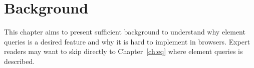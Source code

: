 \documentclass[a4paper,11pt]{kth-mag}
\begin{document}


  \chapter{Background}\label{ch:background}
    This chapter aims to present sufficient background to understand why element queries is a desired feature and why it is hard to implement  in \glspl{browser}.
    Expert readers may want to skip directly to Chapter~\ref{ch:eq} where element queries is described.
\end{document}
